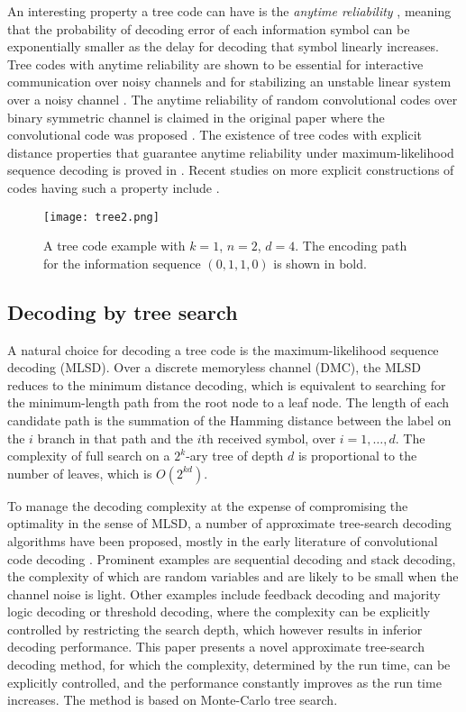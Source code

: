 \documentclass[conference,letterpaper]{IEEEtran}
\begin{document}
An interesting property a tree code can have is the \emph{anytime reliability} \cite{Sahai_Mitter_06}, meaning that the probability of decoding error of each information symbol can be exponentially smaller as the delay for decoding that symbol linearly increases.
Tree codes with anytime reliability are shown to be essential for interactive communication over noisy channels \cite{Schulman96_iter_comm} and for stabilizing an unstable linear system over a noisy channel \cite{Sahai_Mitter_06}.
The anytime reliability of random convolutional codes over binary symmetric channel is claimed in the original paper where the convolutional code was proposed \cite{Elias_conv}. The existence of tree codes with explicit distance properties that guarantee anytime reliability under maximum-likelihood sequence decoding is proved in \cite{Schulman96_iter_comm}. Recent studies on more explicit constructions of codes having such a property include \cite{LTI_at_codes16,at_ldpccc,at_spcc}.
\begin{figure}[t]
	\centering
	\texttt{[image: tree2.png]}
	\caption{A tree code example with $k=1$, $n=2$, $d=4$. The encoding path for the information sequence $(0,1,1,0)$ is shown in bold.}
	\label{fig:tree}
\end{figure}

\subsection{Decoding by tree search}\label{sec:intro_MLSD}
A natural choice for decoding a tree code is the maximum-likelihood sequence decoding (MLSD). 
Over a discrete memoryless channel (DMC), the MLSD reduces to the minimum distance decoding, which is equivalent to searching for the minimum-length path from the root node to a leaf node. The length of each candidate path is the summation of the Hamming distance between the label on the $i$ branch in that path and the $i$th received symbol, over $i=1,\ldots,d$.
The complexity of full search on a $2^k$-ary tree of depth $d$ is proportional to the number of leaves, which is $O(2^{kd})$.

To manage the decoding complexity at the expense of compromising the optimality in the sense of MLSD, a number of approximate tree-search decoding algorithms have been proposed, mostly in the early literature of convolutional code decoding \cite{ECC_book_ShuLin} \cite[Chapter~8]{digit_comm_book5}. Prominent examples are sequential decoding and stack decoding, the complexity of which are random variables and are likely to be small when the channel noise is light. Other examples include feedback decoding and majority logic decoding or threshold decoding, where the complexity can be explicitly controlled by restricting the search depth, which however results in inferior decoding performance.
This paper presents a novel approximate tree-search decoding method, for which the complexity, determined by the run time, can be explicitly controlled, and the performance constantly improves as the run time increases. The method is based on Monte-Carlo tree search.
\end{document}
